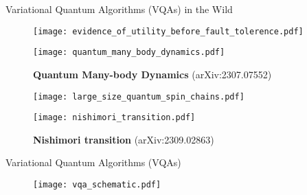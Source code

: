 \begin{frame}{Variational Quantum Algorithms (VQAs) in the Wild}
  \vspace*{-3mm}
  \begin{figure}
      \captionsetup{justification=centering}
      \begin{minipage}{.5\textwidth}
        \caption*{\textbf{Utility Before Fault Tolerance} \\ (Nature 618, 500–505)}
          \vspace*{-3mm}
          \texttt{[image: evidence\_of\_utility\_before\_fault\_tolerence.pdf]}
      \end{minipage}%
      \begin{minipage}{0.5\textwidth}
        \caption*{\textbf{Quantum Many-body Dynamics} (arXiv:2307.07552)}
          \vspace*{-3mm}
          \texttt{[image: quantum\_many\_body\_dynamics.pdf]}
      \end{minipage}
  \end{figure}%
  \vspace*{-2mm}
  \begin{figure}

      \captionsetup{justification=centering}
      \begin{minipage}{.5\textwidth}
        \caption*{\textbf{Quantum Spin Chains} (arXiv:2207.0999)}
          \vspace*{-3mm}
          \texttt{[image: large\_size\_quantum\_spin\_chains.pdf]}
      \end{minipage}%
      \begin{minipage}{0.5\textwidth}
        \caption*{\textbf{Nishimori transition} (arXiv:2309.02863)}
          \vspace*{-3mm}
          \texttt{[image: nishimori\_transition.pdf]}
      \end{minipage}
  \end{figure}
\end{frame}

\begin{frame}{Variational Quantum Algorithms (VQAs)}
   \vspace*{-4mm}
   \begin{figure}
      \centering
      \texttt{[image: vqa\_schematic.pdf]}
    \end{figure}
\end{frame}


